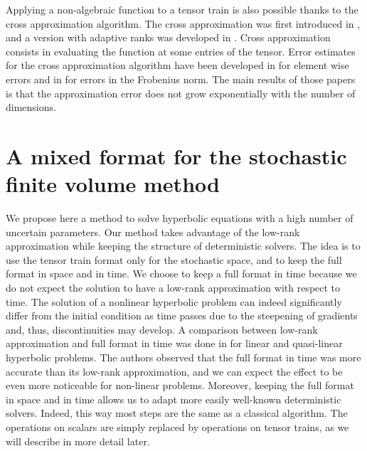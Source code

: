 \documentclass{article}
\begin{document}
Applying a non-algebraic function to a tensor train is also possible thanks to the cross approximation algorithm. The cross approximation was first introduced in \cite{oseledets_tt-cross_2010}, and a version with adaptive ranks was developed in \cite{savostyanov_fast_2011}.
Cross approximation consists in evaluating the function at some entries of the tensor. 
Error estimates for the cross approximation algorithm have been developed in \cite{savostyanov_quasioptimality_2014,osinsky_tensor_2019} for element wise errors and in \cite{qin_error_2022} for errors in the Frobenius norm. 
The main results of those papers is that the approximation error does not grow exponentially with the number of dimensions. 



\section{A mixed format for the stochastic finite volume method} \label{sec:Mixed}
We propose here a method to solve hyperbolic equations with a high number of uncertain parameters. 
Our method takes advantage of the low-rank approximation while keeping the structure of deterministic solvers. 
The idea is to use the tensor train format only for the stochastic space, and to keep the full format in space and in time. 
We choose to keep a full format in time because we do not expect the solution to have a low-rank approximation with respect to time. 
The solution of a nonlinear hyperbolic problem can indeed significantly differ from the initial condition as time passes due to the steepening of gradients and, thus, discontinuities may develop.
A comparison between low-rank approximation and full format in time was done in \cite{zhong_fast_2018} for linear and quasi-linear hyperbolic problems. 
The authors observed that the full format in time was more accurate than its low-rank approximation, and 
we can expect the effect to be even more noticeable for non-linear problems. 
Moreover, keeping the full format in space and in time allows us to adapt more easily well-known deterministic solvers.
Indeed, this way most steps are the same as a classical algorithm. The operations on scalars are simply replaced by operations on tensor trains, as we will describe in more detail later.  
\end{document}

